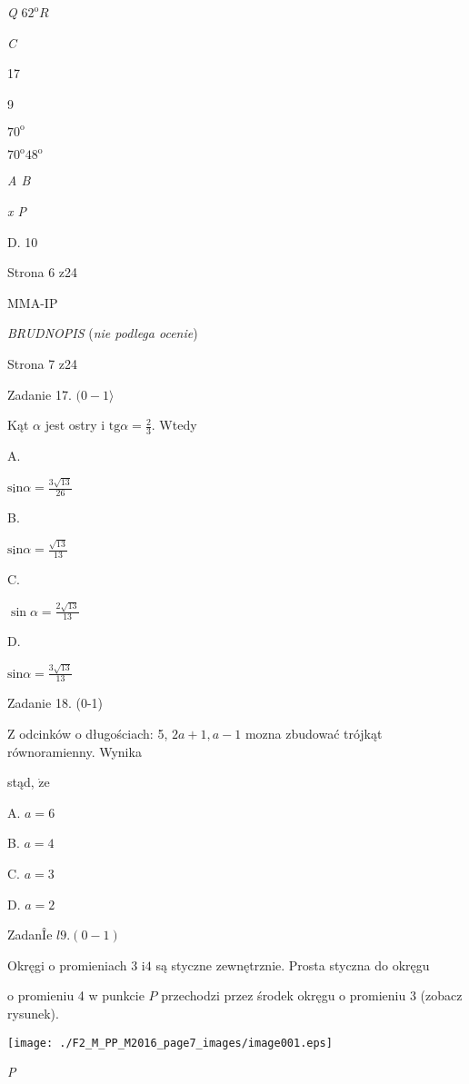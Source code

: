 \documentclass[a4paper,12pt]{article}
\begin{document}
{\it Q} $62^{\mathrm{o}} R$

{\it C}

17

9

$70^{\mathrm{o}}$

$70^{\mathrm{o}}  48^{\mathrm{o}}$

{\it A B}

{\it x  P}

D. 10

Strona 6 z24

MMA-IP





{\it BRUDNOPIS} ({\it nie podlega ocenie})

Strona 7 z24





Zadanie 17. $(0-1\rangle$

Kąt $\alpha$ jest ostry i $\displaystyle \mathrm{t}\mathrm{g}\alpha=\frac{2}{3}$. Wtedy

A.

$\mathrm{s}$i$\displaystyle \mathrm{n}\alpha=\frac{3\sqrt{13}}{26}$

B.

$\mathrm{s}$i$\displaystyle \mathrm{n}\alpha=\frac{\sqrt{13}}{13}$

C.

$\displaystyle \sin\alpha=\frac{2\sqrt{13}}{13}$

D.

$\mathrm{s}$i$\displaystyle \mathrm{n}\alpha=\frac{3\sqrt{13}}{13}$

Zadanie 18. (0-1)

$\mathrm{Z}$ odcinków o długościach: 5, $2a+1, a-1$ mozna zbudować trójkąt równoramienny. Wynika

stąd, $\dot{\mathrm{z}}\mathrm{e}$

A. $a=6$

B. $a=4$

C. $a=3$

D. $a=2$

ZadanÎe $l9. (0-1)$

Okręgi o promieniach 3 $\mathrm{i} 4$ są styczne zewnętrznie. Prosta styczna do okręgu

o promieniu 4 w punkcie $P$ przechodzi przez środek okręgu o promieniu 3 (zobacz rysunek).
\begin{center}
\texttt{[image: ./F2\_M\_PP\_M2016\_page7\_images/image001.eps]}
\end{center}
{\it P}
\end{document}
